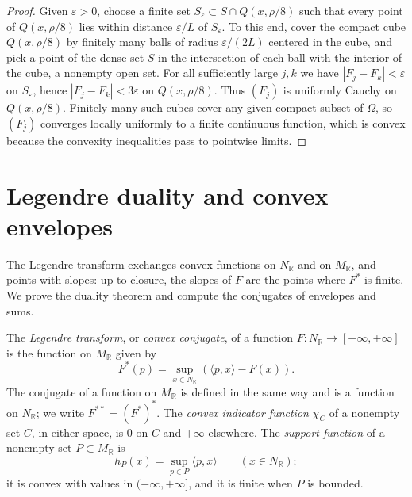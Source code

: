 \begin{proof}
Given $\varepsilon>0$, choose a finite set $S_\varepsilon\subset S\cap Q(x,\rho/8)$ such that every point of $Q(x,\rho/8)$ lies within distance $\varepsilon/L$ of $S_\varepsilon$. To this end, cover the compact cube $Q(x,\rho/8)$ by finitely many balls of radius $\varepsilon/(2L)$ centered in the cube, and pick a point of the dense set $S$ in the intersection of each ball with the interior of the cube, a nonempty open set. For all sufficiently large $j,k$ we have $|F_j-F_k|<\varepsilon$ on $S_\varepsilon$, hence $|F_j-F_k|<3\varepsilon$ on $Q(x,\rho/8)$. Thus $(F_j)$ is uniformly Cauchy on $Q(x,\rho/8)$. Finitely many such cubes cover any given compact subset of $\Omega$, so $(F_j)$ converges locally uniformly to a finite continuous function, which is convex because the convexity inequalities pass to pointwise limits.
\end{proof}



\section{Legendre duality and convex envelopes}
\label{sec:finite-dimensional-legendre-duality}
The Legendre transform exchanges convex functions on $N_{\mathbb R}$ and on $M_{\mathbb R}$, and points with slopes: up to closure, the slopes of $F$ are the points where $F^*$ is finite. We prove the duality theorem and compute the conjugates of envelopes and sums.

\begin{definition}\label{def:convex-legendre-transform}
The \emph{Legendre transform}, or \emph{convex conjugate}, of a function $F\colon N_{\mathbb R}\to[-\infty,+\infty]$ is the function on $M_{\mathbb R}$ given by
\[
 F^*(p)=\sup_{x\in N_{\mathbb R}}(\langle p,x\rangle-F(x)).
\]
The conjugate of a function on $M_{\mathbb R}$ is defined in the same way and is a function on $N_{\mathbb R}$; we write $F^{**}=(F^*)^*$. The \emph{convex indicator function} $\chi_C$ of a nonempty set $C$, in either space, is $0$ on $C$ and $+\infty$ elsewhere. The \emph{support function} of a nonempty set $P\subset M_{\mathbb R}$ is
\[
 h_P(x)=\sup_{p\in P}\langle p,x\rangle\qquad(x\in N_{\mathbb R});
\]
it is convex with values in $(-\infty,+\infty]$, and it is finite when $P$ is bounded.
\end{definition}

